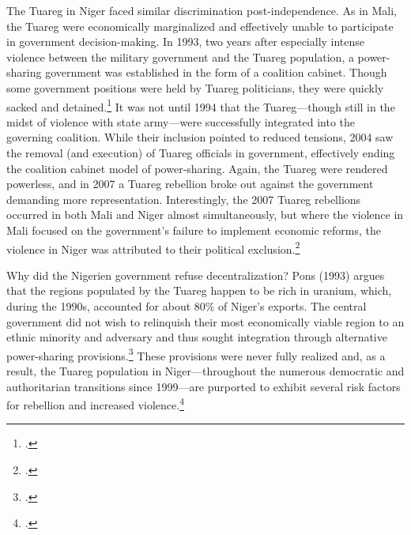 \documentclass[12pt]{article}
\begin{document}
The Tuareg in Niger faced similar discrimination post-independence. As in Mali, the Tuareg were economically marginalized and effectively unable to participate in government decision-making. In 1993, two years after especially intense violence between the military government and the Tuareg population, a power-sharing government was established in the form of a coalition cabinet. Though some government positions were held by Tuareg politicians, they were quickly sacked and detained.\footcite{krings_marginalisation_1995} It was not until 1994 that the Tuareg---though still in the midst of violence with state army---were successfully integrated into the governing coalition. While their inclusion pointed to reduced tensions, 2004 saw the removal (and execution) of Tuareg officials in government, effectively ending the coalition cabinet model of power-sharing. Again, the Tuareg were rendered powerless, and in 2007 a Tuareg rebellion broke out against the government demanding more representation. Interestingly, the 2007 Tuareg rebellions occurred in both Mali and Niger almost simultaneously, but where the violence in Mali focused on the government's failure to implement economic reforms, the violence in Niger was attributed to their political exclusion.\footcite{bertelsmann_stiftung_niger_nodate}

Why did the Nigerien government refuse decentralization? Pons (1993) argues that the regions populated by the Tuareg happen to be rich in uranium, which, during the 1990s, accounted for about 80\% of Niger's exports. The central government did not wish to relinquish their most economically viable region to an ethnic minority and adversary and thus sought integration through alternative power-sharing provisions.\footcite{krings_marginalisation_1995, pons_probleme_1993} These provisions were never fully realized and, as a result, the Tuareg population in Niger---throughout the numerous democratic and authoritarian transitions since 1999---are purported to exhibit several risk factors for rebellion and increased violence.\footcite{minorities_at_risk_project_minorities_2009} 
\end{document}

